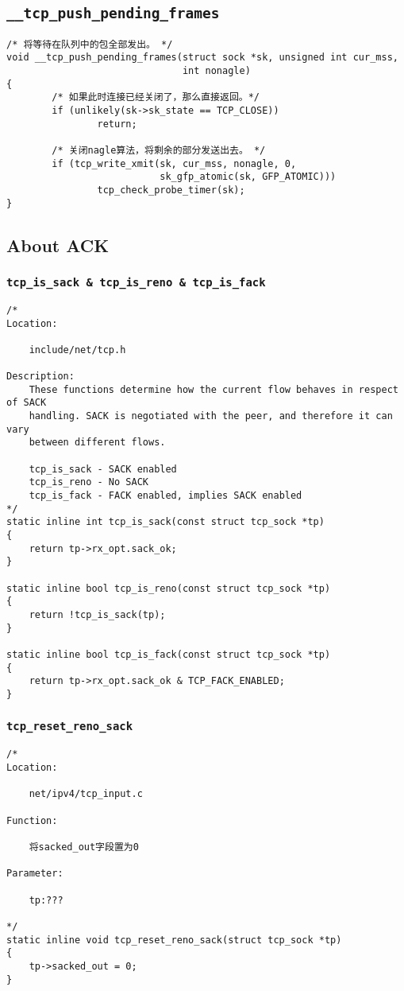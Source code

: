     \subsection{\texttt{__tcp_push_pending_frames}}
\begin{verbatim}
/* 将等待在队列中的包全部发出。 */
void __tcp_push_pending_frames(struct sock *sk, unsigned int cur_mss,
                               int nonagle)
{
        /* 如果此时连接已经关闭了，那么直接返回。*/
        if (unlikely(sk->sk_state == TCP_CLOSE))
                return;

        /* 关闭nagle算法，将剩余的部分发送出去。 */
        if (tcp_write_xmit(sk, cur_mss, nonagle, 0,
                           sk_gfp_atomic(sk, GFP_ATOMIC)))
                tcp_check_probe_timer(sk);
}
\end{verbatim}
    \subsection{About ACK}
        \subsubsection{\texttt{tcp_is_sack & tcp_is_reno & tcp_is_fack}}
\begin{verbatim}
/* 
Location:

    include/net/tcp.h

Description:
    These functions determine how the current flow behaves in respect of SACK
    handling. SACK is negotiated with the peer, and therefore it can vary
    between different flows.

    tcp_is_sack - SACK enabled
    tcp_is_reno - No SACK
    tcp_is_fack - FACK enabled, implies SACK enabled
*/
static inline int tcp_is_sack(const struct tcp_sock *tp)
{
    return tp->rx_opt.sack_ok;
}

static inline bool tcp_is_reno(const struct tcp_sock *tp)
{
    return !tcp_is_sack(tp);
}

static inline bool tcp_is_fack(const struct tcp_sock *tp)
{
    return tp->rx_opt.sack_ok & TCP_FACK_ENABLED;
}
\end{verbatim}

        \subsubsection{\texttt{tcp_reset_reno_sack}}
\begin{verbatim}
/*
Location:

    net/ipv4/tcp_input.c

Function:

    将sacked_out字段置为0

Parameter:

    tp:???

*/
static inline void tcp_reset_reno_sack(struct tcp_sock *tp)
{
    tp->sacked_out = 0;
}
\end{verbatim}    
